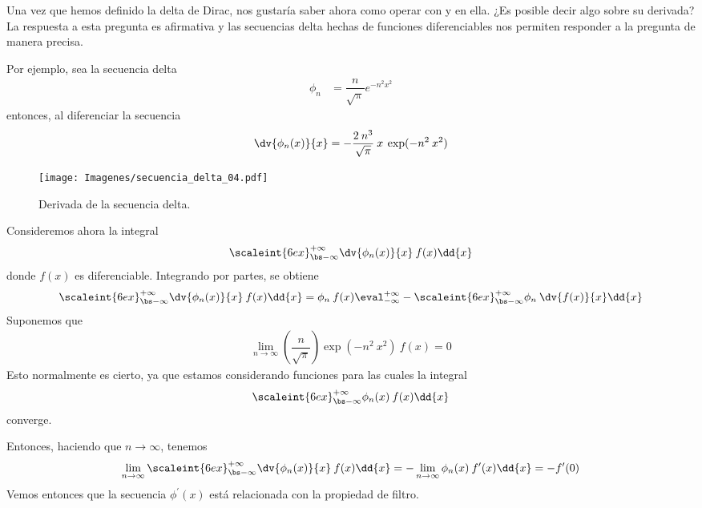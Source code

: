 Una vez que hemos definido la delta de Dirac, nos gustaría saber ahora como operar con y en ella. ¿Es posible decir algo sobre su derivada? La respuesta a esta pregunta es afirmativa y las secuencias delta hechas de funciones diferenciables nos permiten responder a la pregunta de manera precisa.
\par
Por ejemplo, sea la secuencia delta
\begin{align*}
\phi_{n} &= \dfrac{n}{\sqrt{\pi}} e^{-n^{2} x^{2}}
\end{align*}
entonces, al diferenciar la secuencia
\begin{align*}
\dv{\phi_{n}(x)}{x} = - \dfrac{2 \: n^{3}}{\sqrt{\pi}} \: x \: \exp(-n^{2} \: x^{2})
\end{align*}
\begin{figure}[H]
    \centering
    \texttt{[image: Imagenes/secuencia\_delta\_04.pdf]}
    \caption{Derivada de la secuencia delta.}
    \label{fig:fig_figura_delta_04}
\end{figure}
Consideremos ahora la integral
\begin{align*}
\scaleint{6ex}_{\bs -\infty}^{+\infty} \dv{\phi_{n}(x)}{x} \: f (x) \dd{x}
\end{align*}
donde $f (x)$ es diferenciable. Integrando por partes, se obtiene
\begin{align*}
\scaleint{6ex}_{\bs -\infty}^{+\infty} \dv{\phi_{n}(x)}{x} \: f (x) \dd{x} = \phi_{n} \: f (x) \eval_{-\infty}^{+\infty} - \scaleint{6ex}_{\bs -\infty}^{+\infty} \phi_{n} \: \dv{f (x)}{x} \dd{x}
\end{align*}
Suponemos que
\begin{align*}
\lim_{n \to \infty} \left( \dfrac{n}{\sqrt{\pi}} \right) \exp(-n^{2} \: x^{2}) \: f (x) = 0
\end{align*}
Esto normalmente es cierto, ya que estamos considerando funciones para las cuales la integral
\begin{align*}
\scaleint{6ex}_{\bs -\infty}^{+\infty} \phi_{n}(x) \: f (x) \dd{x} 
\end{align*}
converge.
\par
Entonces, haciendo que $n \to \infty$, tenemos
\begin{align*}
\lim_{n \to \infty} \scaleint{6ex}_{\bs -\infty}^{+\infty} \dv{\phi_{n}(x)}{x} \: f (x) \dd{x} = - \lim_{n \to \infty} \phi_{n}(x) \: f^{\prime} (x) \dd{x} =  -f^{\prime}(0)
\end{align*}
Vemos entonces que la secuencia $\phi^{\prime}(x)$ está relacionada con la propiedad de filtro.
